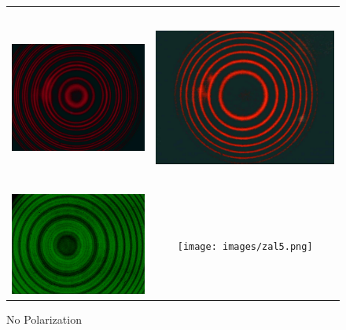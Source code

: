 \documentclass[a4paper,12pt,abstracton]{scrartcl}
\begin{document}
\begin{figure}[H]
    \centering
    \begin{tabular}{c c}
      \includegraphics[height=6cm,keepaspectratio]{images/zn5.png} & \includegraphics[height=6cm,keepaspectratio]{images/znl8.png} \\
      \includegraphics[width=7.5cm,keepaspectratio]{images/za4.png} & \texttt{[image: images/zal5.png]} \\
      \end{tabular}
    \caption{No Polarization }
    \label{fig:np}
\end{figure}
\end{document}
